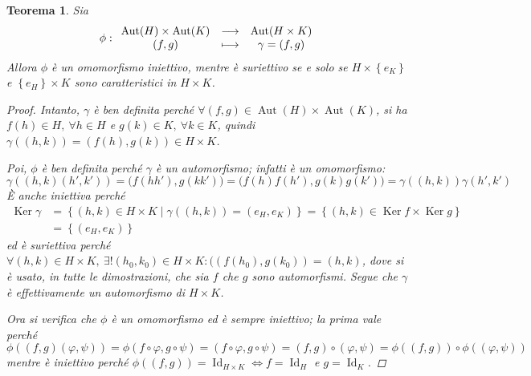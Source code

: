 \documentclass[11pt]{scrartcl}
\theoremstyle{style1}
\newtheorem{teorema}{Teorema}[section]
\numberwithin{equation}{subsection}
\begin{document}
\begin{teorema}
	Sia
	\[
	\phi : 
	\begin{array}
		{c c c}
		\operatorname{Aut} (H) \times \operatorname{Aut} (K) & \longrightarrow & \operatorname{Aut} (H \times K)\\
		(f,g) & \longmapsto & \gamma = (f,g)
	\end{array}
	\] 
	Allora $\phi $ \`e un omomorfismo iniettivo, mentre \`e suriettivo se e solo se $H \times \left\{ e_K \right\} $ e $\left\{ e_H \right\} \times K$ sono caratteristici in $H\times K$.
	\begin{proof}
		Intanto, $\gamma$ \`e ben definita perch\'e $\forall (f , g) \in \operatorname{Aut} (H ) \times \operatorname{Aut}(K) $, si ha $f(h) \in H, \ \forall h \in H$ e $g(k) \in K, \ \forall k \in K$, quindi $\gamma((h,k)) = (f(h),g(k)) \in H \times  K$.
		
		Poi, $\phi $ \`e ben definita perch\'e $\gamma$ \`e un automorfismo; infatti \`e un omomorfismo:
		\[
		\gamma((h,k)(h',k'))=\big(f(hh'),g(kk')\big) = \big(f(h)f(h') , g(k) g(k')\big) =\gamma((h,k)) \gamma(h',k')
		\] 
		\`E anche iniettiva perch\'e 
\[
	\begin{split}
		\operatorname{Ker} \gamma &= \left\{ (h,k) \in H \times K  \mid \gamma((h,k)) = (e_H,e_K) \right\} = \left\{ (h,k) \in \operatorname{Ker} f \times \operatorname{Ker} g \right\} \\
					  &= \left\{ (e_H,e_K) \right\} 
	\end{split}
\] 
		ed \`e suriettiva perch\'e $\forall (h,k) \in H \times  K, \ \exists ! (h_0,k_0) \in H\times K : ((f(h_0),g(k_0)) = (h,k)$, dove si \`e usato, in tutte le dimostrazioni, che sia $f$ che $g$ sono automorfismi.
		Segue che $\gamma$ \`e effettivamente un automorfismo di $H \times K$.

Ora si verifica che $\phi $ \`e un omomorfismo ed \`e sempre iniettivo; la prima vale perch\'e 
\[
\phi ((f,g)(\varphi ,\psi )) = \phi (f\circ\varphi ,g\circ\psi ) = (f\circ\varphi , g \circ\psi )= (f,g)\circ(\varphi ,\psi )=\phi ((f,g))\circ \phi ((\varphi ,\psi ))
\] 
mentre \`e iniettivo perch\'e $\phi ((f,g))= \operatorname{Id} _{H\times K}  \iff f = \operatorname{Id} _H$ e $g = \operatorname{Id} _K$.


\end{proof}
\end{teorema}
\end{document}
